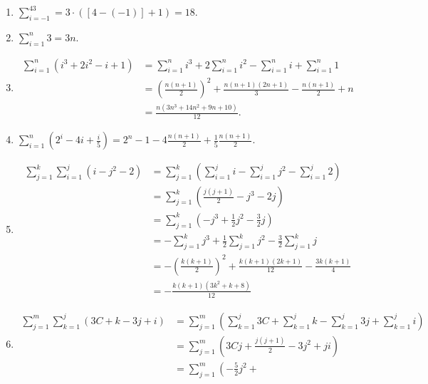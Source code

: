 \documentclass[9pt]{article}
\newcommand{\D}{\displaystyle}
\begin{document}
\begin{enumerate}
      \begin{enumerate}
         \item $\D\sum_{i=-1}^43 = 3 \cdot ([4 - (-1)] + 1) = 18$.
         \item $\D\sum_{i=1}^n3 = 3n$.
         \item \begin{align*}
                  \sum_{i=1}^n (i^3 + 2i^2 - i + 1) &= \sum_{i=1}^n i^3 +
                     2\sum_{i=1}^ni^2 - \sum_{i=1}^ni + \sum_{i=1}^n1 \\
                  &= \left(\frac{n(n+1)}{2}\right)^2 + \frac{n(n+1)(2n+1)}{3} -
                     \frac{n(n+1)}{2} + n \\
                  &= \frac{n(3n^3 + 14n^2 + 9n + 10)}{12}.
               \end{align*}
         \item $\D\sum_{i=1}^n \left(2^i - 4i + \frac{i}{5}\right) = 2^{n}-1
                -4\frac{n(n+1)}{2} + \frac{1}{5}\frac{n(n+1)}{2}$.
         \item \begin{align*}
                  \sum_{j=1}^k\sum_{i=1}^j (i - j^2 - 2) &=
                     \sum_{j=1}^k\left(\sum_{i=1}^ji - \sum_{i=1}^jj^2 -
                     \sum_{i=1}^j2\right) \\
                     &= \sum_{j=1}^k\left(\frac{j(j+1)}{2} - j^3 -2j\right) \\
                     &= \sum_{j=1}^k\left(-j^3 + \frac{1}{2}j^2 -
                           \frac{3}{2}j \right) \\
                     &= -\sum_{j=1}^kj^3 + \frac{1}{2}\sum_{j=1}^kj^2 -
                           \frac{3}{2}\sum_{j=1}^kj \\
                     &= -\left(\frac{k(k+1)}{2}\right)^2 +
                           \frac{k(k+1)(2k+1)}{12} - \frac{3k(k+1)}{4} \\
                     &= -\frac{k(k + 1)(3k^2 + k + 8)}{12}
               \end{align*}
         \item \begin{align*}
                  \sum_{j=1}^m\sum_{k=1}^j (3C + k - 3j + i) &=
                     \sum_{j=1}^m\left(\sum_{k=1}^j3C + \sum_{k=1}^jk -
                     \sum_{k=1}^j3j + \sum_{k=1}^ji\right) \\
                     &= \sum_{j=1}^m\left(3Cj + \frac{j(j+1)}{2} - 3j^2 +
                           ji\right) \\
                     &= \sum_{j=1}^m\left(-\frac{5}{2}j^2 +

\end{align*}
\end{enumerate}
\end{enumerate}
\end{document}
